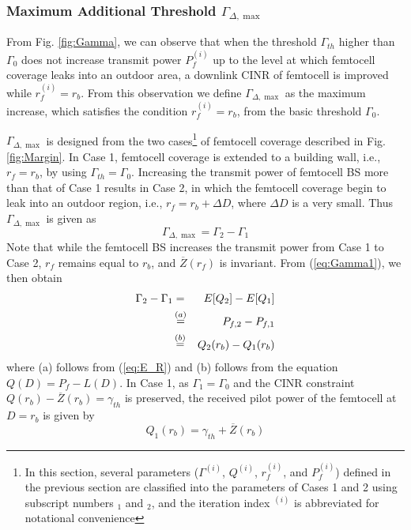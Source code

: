 \documentclass[draftclsnofoot,12pt,onecolumn]{IEEEtran}
\begin{document}
\subsubsection{Maximum Additional Threshold $\Gamma_{\Delta,\max}$}
From Fig. \ref{fig:Gamma}, we can observe that when the threshold
$\Gamma_{th}$ higher than $\Gamma_0$ does not increase transmit power $P_f^{(i)}$ up to the level at which femtocell coverage leaks into an outdoor area, a downlink
CINR of femtocell is improved while $r_f^{(i)}=r_b$. From this observation we define $\Gamma_{\Delta,\max}$ as the maximum increase, which satisfies the condition $r_f^{(i)}=r_b$, from the basic threshold $\Gamma_{0}$.

$\Gamma_{\Delta,\max}$ is
designed from the two cases\footnote{In this section, several parameters ($\Gamma^{(i)}$,
$Q^{(i)}$, $r_f^{(i)}$, and $P_f^{(i)}$) defined in the previous
section are classified into the parameters of Cases 1 and 2 using
subscript numbers $_1$ and $_2$, and the iteration index $^{(i)}$ is
abbreviated for notational convenience} of femtocell coverage described in Fig. \ref{fig:Margin}. In Case 1, femtocell coverage is extended to a
building wall, i.e., $r_f=r_b$, by using $\Gamma_{th}=\Gamma_0$.
Increasing the transmit power of femtocell BS more than that of Case
1 results in Case 2, in which the femtocell coverage begin to leak into
an outdoor region, i.e., $r_f=r_b+\Delta D$, where $\Delta D$ is a
very small. Thus $\Gamma_{\Delta,\max}$ is given as
\begin{equation}\label{eq:GammaDeltaMax}
\Gamma_{\Delta,\max}=\Gamma_{2}-\Gamma_{1}
\end{equation}
Note that while the femtocell BS
increases the transmit power from Case 1 to Case 2, $r_f$ remains
equal to $r_b$, and $\overline{Z}(r_f)$ is invariant. From (\ref{eq:Gamma1}), we then obtain
\begin{eqnarray}\label{eq:GammaDeltaMax1}
\Gamma_{2}-\Gamma_{1}&=&E[Q_2]-E[Q_1]\cr
&\mathop =\limits^{\left( a \right)}&P_{f,2}-P_{f,1}\cr
&\mathop =\limits^{\left( b \right)}&Q_{2}(r_b)-Q_{1}(r_b)
\end{eqnarray}
where (a) follows from (\ref{eq:E_R}) and (b) follows from the equation
$Q(D)=P_f-L\left(D\right)$.
In Case 1, as $\Gamma_{1}=\Gamma_0$ and the CINR constraint
$Q(r_b)-\overline{Z}(r_b)=\gamma_{th}$ is preserved, the received
pilot power of the femtocell at $D=r_b$ is given by
\begin{equation}
Q_{1}(r_b)=\gamma_{th}+\overline{Z}(r_b)\label{eq:Qin}
\end{equation}
\end{document}
